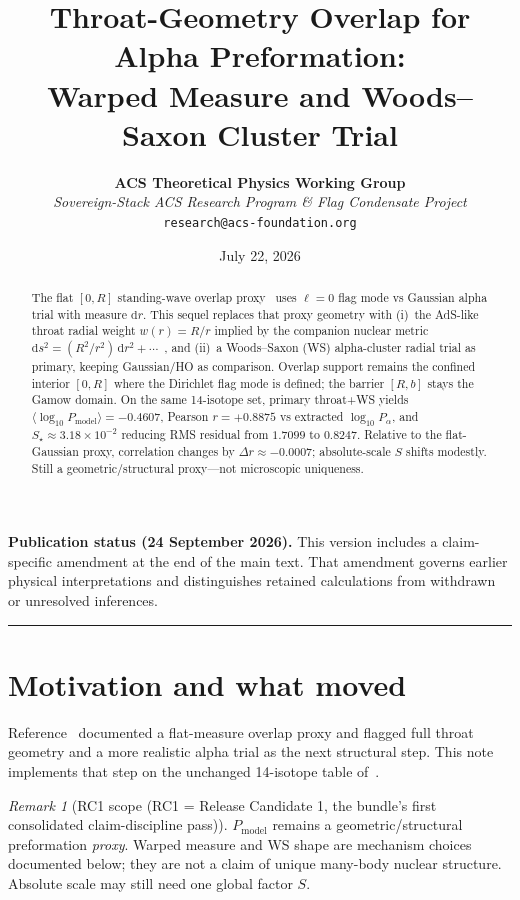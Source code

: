 \documentclass[11pt,a4paper]{article}
\title{\LARGE\bfseries Throat-Geometry Overlap for Alpha Preformation:\\
Warped Measure and Woods--Saxon Cluster Trial}
\author{\textbf{ACS Theoretical Physics Working Group}\\[0.3em]
\small\textit{Sovereign-Stack ACS Research Program \& Flag Condensate Project}\\
\small\texttt{research@acs-foundation.org}}
\date{July 22, 2026}
\theoremstyle{remark}
\newtheorem*{remark}{Remark}
\newcommand{\dd}{\mathrm{d}}
\begin{document}
\maketitle

\begin{abstract}
The flat $[0,R]$ standing-wave overlap proxy~\cite{PalphaOverlap2026}
uses $\ell=0$ flag mode vs Gaussian alpha trial with measure $\dd r$.
This sequel replaces that proxy geometry with (i)~the AdS-like throat
radial weight $w(r)=R/r$ implied by the companion nuclear metric
$\dd s^2=(R^2/r^2)\,\dd r^2+\cdots$~\cite{NuclearDecay2026}, and
(ii)~a Woods--Saxon (WS) alpha-cluster radial trial as primary, keeping
Gaussian/HO as comparison.  Overlap support remains the confined interior
$[0,R]$ where the Dirichlet flag mode is defined; the barrier $[R,b]$ stays
the Gamow domain.  On the same 14-isotope set, primary throat+WS yields
$\langle\log_{10} P_{\mathrm{model}}\rangle=-0.4607$, Pearson
$r=+0.8875$ vs extracted $\log_{10} P_\alpha$, and
$S_\star\approx 3.18\times 10^{-2}$ reducing RMS residual from $1.7099$
to $0.8247$.  Relative to the flat-Gaussian proxy, correlation changes by
$\Delta r\approx -0.0007$; absolute-scale $S$ shifts modestly.  Still a
geometric/structural proxy---not microscopic uniqueness.
\end{abstract}
\par\smallskip\noindent\textbf{Publication status (24 September 2026).}
This version includes a claim-specific amendment at the end of the main text.
That amendment governs earlier physical interpretations and distinguishes
retained calculations from withdrawn or unresolved inferences.\par\smallskip


\vspace{0.1em}
\hrule
\vspace{0.4em}

\section{Motivation and what moved}

Reference~\cite{PalphaOverlap2026} documented a flat-measure overlap
proxy and flagged full throat geometry and a more realistic alpha trial
as the next structural step.  This note implements that step on the
unchanged 14-isotope table of~\cite{NuclearDecay2026}.

\begin{remark}[RC1 scope (RC1 = Release Candidate 1, the bundle's first consolidated claim-discipline pass)]
$P_{\mathrm{model}}$ remains a geometric/structural preformation
\emph{proxy}.  Warped measure and WS shape are mechanism choices
documented below; they are not a claim of unique many-body nuclear
structure.  Absolute scale may still need one global factor $S$.
\end{remark}
\end{document}
